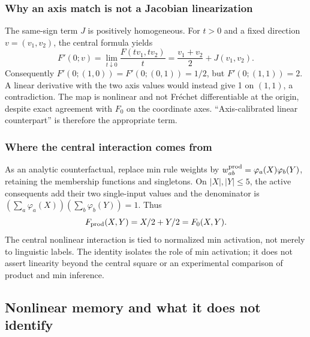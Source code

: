 \subsubsection{Why an axis match is not a Jacobian linearization}
The same-sign term $J$ is positively homogeneous. For $t>0$ and a fixed
direction $v=(v_1,v_2)$, the central formula yields
\begin{equation}
 F'(0;v)=\lim_{t\downarrow0}\frac{F(tv_1,tv_2)}t
 =\frac{v_1+v_2}{2}+J(v_1,v_2).
 \label{detail:eq:fpd_direction}
\end{equation}
Consequently $F'(0;(1,0))=F'(0;(0,1))=1/2$, but
$F'(0;(1,1))=2$. A linear derivative with the two axis values would
instead give 1 on $(1,1)$, a contradiction. The map is nonlinear and not
Fr\'echet differentiable at the origin, despite exact agreement with
$F_0$ on the coordinate axes. ``Axis-calibrated linear counterpart'' is
therefore the appropriate term.

\subsubsection{Where the central interaction comes from}
As an analytic counterfactual, replace min rule weights by
$w^{\rm prod}_{ab}=\varphi_a(X)\varphi_b(Y)$, retaining the membership functions
and singletons. On $|X|,|Y|\le5$, the active consequents add their two
single-input values and the denominator is
$(\sum_a\varphi_a(X))(\sum_b\varphi_b(Y))=1$. Thus
\begin{equation}
 F_{\rm prod}(X,Y)=X/2+Y/2=F_0(X,Y).
 \label{detail:eq:fpd_product}
\end{equation}
The central nonlinear interaction is tied to normalized min activation,
not merely to linguistic labels. The identity isolates the role of min activation; it does not assert
linearity beyond the central square or an experimental comparison of
product and min inference.

\subsection{Nonlinear memory and what it does not identify}

